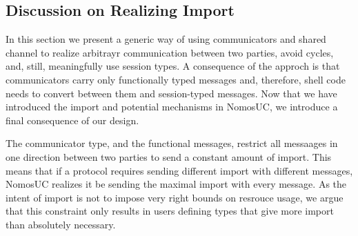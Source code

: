 %
%

\subsection{Discussion on Realizing Import}
In this section we present a generic way of using communicators and shared channel to realize arbitrayr communication between two parties, avoid cycles, and, still, meaningfully use session types.
A consequence of the approch is that communicators carry only functionally typed messages and, therefore, shell code needs to convert between them and session-typed messages.
Now that we have introduced the import and potential mechanisms in NomosUC, we introduce a final consequence of our design.

The communicator type, and the functional messages, restrict all messaages in one direction between two parties to send a constant amount of import.
This means that if a protocol requires sending different import with different messages, NomosUC realizes it be sending the maximal import with every message.
As the intent of import is not to impose very right bounds on resrouce usage, we argue that this constraint only results in users defining types that give more import than absolutely necessary.

%
